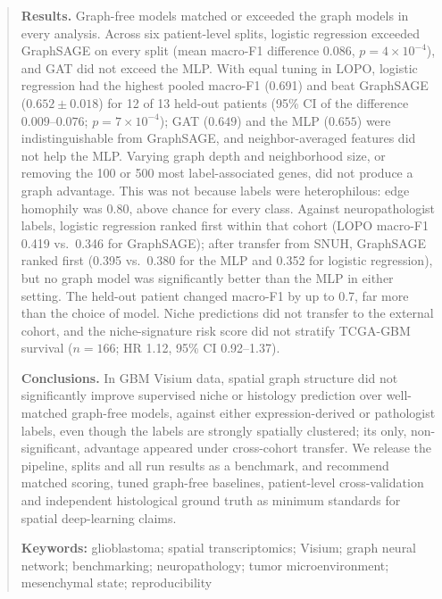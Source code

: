 \documentclass[11pt,letterpaper]{article}
\begin{document}
\begin{abstract}
\noindent\textbf{Results.} Graph-free models matched or exceeded the graph models in every analysis. Across six patient-level splits, logistic regression exceeded GraphSAGE on every split (mean macro-F1 difference $0.086$, $p = 4 \times 10^{-4}$), and GAT did not exceed the MLP. With equal tuning in LOPO, logistic regression had the highest pooled macro-F1 (0.691) and beat GraphSAGE ($0.652 \pm 0.018$) for 12 of 13 held-out patients (95\% CI of the difference $0.009$--$0.076$; $p = 7 \times 10^{-4}$); GAT ($0.649$) and the MLP ($0.655$) were indistinguishable from GraphSAGE, and neighbor-averaged features did not help the MLP. Varying graph depth and neighborhood size, or removing the 100 or 500 most label-associated genes, did not produce a graph advantage. This was not because labels were heterophilous: edge homophily was 0.80, above chance for every class. Against neuropathologist labels, logistic regression ranked first within that cohort (LOPO macro-F1 0.419 vs.\ 0.346 for GraphSAGE); after transfer from SNUH, GraphSAGE ranked first (0.395 vs.\ 0.380 for the MLP and 0.352 for logistic regression), but no graph model was significantly better than the MLP in either setting. The held-out patient changed macro-F1 by up to 0.7, far more than the choice of model. Niche predictions did not transfer to the external cohort, and the niche-signature risk score did not stratify TCGA-GBM survival ($n = 166$; HR 1.12, 95\% CI 0.92--1.37).

\noindent\textbf{Conclusions.} In GBM Visium data, spatial graph structure did not significantly improve supervised niche or histology prediction over well-matched graph-free models, against either expression-derived or pathologist labels, even though the labels are strongly spatially clustered; its only, non-significant, advantage appeared under cross-cohort transfer. We release the pipeline, splits and all run results as a benchmark, and recommend matched scoring, tuned graph-free baselines, patient-level cross-validation and independent histological ground truth as minimum standards for spatial deep-learning claims.

\vspace{0.5em}
\noindent\textbf{Keywords:} glioblastoma; spatial transcriptomics; Visium; graph neural network; benchmarking; neuropathology; tumor microenvironment; mesenchymal state; reproducibility
\end{abstract}

\vspace{1em}

\end{document}
